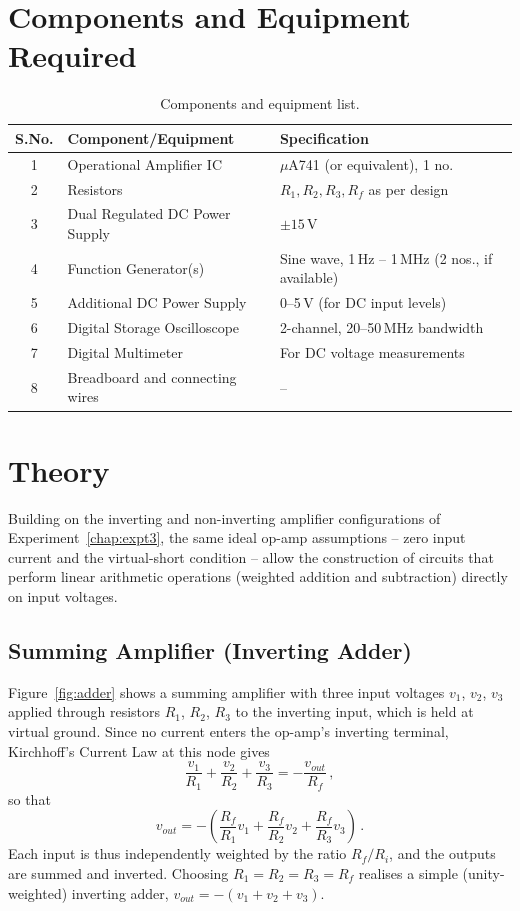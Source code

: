 \section{Components and Equipment Required}
\begin{table}[h!]
	\centering
	\begin{tabular}{@{}cll@{}}
		\toprule
		S.No. & Component/Equipment & Specification \\
		\midrule
		1  & Operational Amplifier IC & $\mu$A741 (or equivalent), 1 no. \\
		2  & Resistors & $R_1, R_2, R_3, R_f$ as per design \\
		3  & Dual Regulated DC Power Supply & $\pm 15\,\text{V}$ \\
		4  & Function Generator(s) & Sine wave, 1\,Hz -- 1\,MHz (2 nos., if available) \\
		5  & Additional DC Power Supply & 0--5\,V (for DC input levels) \\
		6  & Digital Storage Oscilloscope & 2-channel, 20--50\,MHz bandwidth \\
		7  & Digital Multimeter & For DC voltage measurements \\
		8  & Breadboard and connecting wires & -- \\
		\bottomrule
	\end{tabular}
	\caption{Components and equipment list.}
\end{table}

\section{Theory}

Building on the inverting and non-inverting amplifier configurations of Experiment~\ref{chap:expt3}, the same ideal op-amp assumptions -- zero input current and the virtual-short condition -- allow the construction of circuits that perform linear arithmetic operations (weighted addition and subtraction) directly on input voltages.

\subsection{Summing Amplifier (Inverting Adder)}

Figure~\ref{fig:adder} shows a summing amplifier with three input voltages $v_1$, $v_2$, $v_3$ applied through resistors $R_1$, $R_2$, $R_3$ to the inverting input, which is held at virtual ground. Since no current enters the op-amp's inverting terminal, Kirchhoff's Current Law at this node gives
\begin{equation}
	\frac{v_1}{R_1} + \frac{v_2}{R_2} + \frac{v_3}{R_3} = -\frac{v_{out}}{R_f}\,,
\end{equation}
so that
\begin{equation}
	v_{out} = -\left(\frac{R_f}{R_1}v_1 + \frac{R_f}{R_2}v_2 + \frac{R_f}{R_3}v_3\right)\,.
	\label{eq:adder_gain}
\end{equation}
Each input is thus independently weighted by the ratio $R_f/R_{i}$, and the outputs are summed and inverted. Choosing $R_1 = R_2 = R_3 = R_f$ realises a simple (unity-weighted) inverting adder, $v_{out} = -(v_1+v_2+v_3)$.

